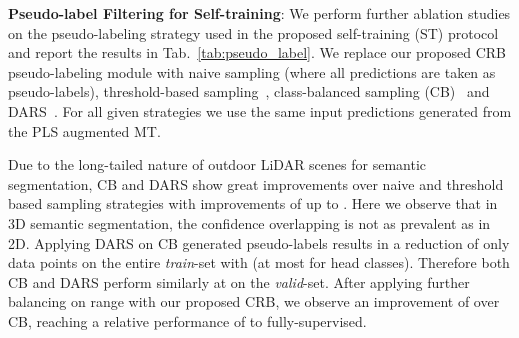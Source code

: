 \documentclass[10pt,twocolumn,letterpaper]{article}
\begin{document}
\noindent \textbf{Pseudo-label Filtering for Self-training}: We perform further ablation studies on the pseudo-labeling strategy used in the proposed self-training (ST) protocol and report the results in Tab.~\ref{tab:pseudo_label}. We replace our proposed CRB pseudo-labeling module with naive sampling (where all predictions are taken as pseudo-labels), threshold-based sampling~\cite{aaai2020curriculum,cvpr2020selftraining, arxiv2020rethinking}, class-balanced sampling (CB)~\cite{eccv2018classbalanced} and DARS~\cite{iccv2021dars}. For all given strategies we use the same input predictions generated from the PLS augmented MT.

Due to the long-tailed nature of outdoor LiDAR scenes for semantic segmentation, CB and DARS show great improvements over naive and threshold based sampling strategies with improvements of up to . Here we observe that in 3D semantic segmentation, the confidence overlapping is not as prevalent as in 2D. Applying DARS on CB generated pseudo-labels results in a reduction of only  data points on the entire \textit{train}-set with  (at most  for head classes). Therefore both CB and DARS perform similarly at  on the \textit{valid}-set.
After applying further balancing on range with our proposed CRB, we observe an improvement of  over CB, reaching a relative performance of  to fully-supervised.

\begin{table}[t]
    \centering
    \tabcolsep=0.11cm
    \caption{Ablation study on the pseudo-labeling strategies comparing naive (all predictions), threshold-based, class-balanced labeling and DARS with our proposed CRB.  determines the percentage of labeled points. Performances are reported on the SemanticKITTI \textit{valid}-set. All methods use the same initial labels.
    \label{tab:pseudo_label}}
\end{table}
\end{document}
